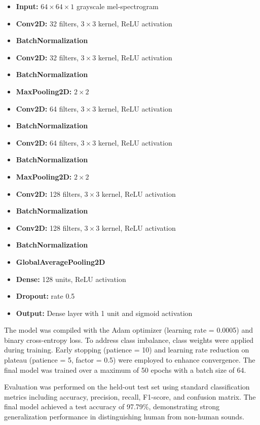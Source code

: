 \begin{itemize}
  \item \textbf{Input:} $64 \times 64 \times 1$ grayscale mel-spectrogram
  \item \textbf{Conv2D:} 32 filters, $3 \times 3$ kernel, ReLU activation
  \item \textbf{BatchNormalization}
  \item \textbf{Conv2D:} 32 filters, $3 \times 3$ kernel, ReLU activation
  \item \textbf{BatchNormalization}
  \item \textbf{MaxPooling2D:} $2 \times 2$
  \item \textbf{Conv2D:} 64 filters, $3 \times 3$ kernel, ReLU activation
  \item \textbf{BatchNormalization}
  \item \textbf{Conv2D:} 64 filters, $3 \times 3$ kernel, ReLU activation
  \item \textbf{BatchNormalization}
  \item \textbf{MaxPooling2D:} $2 \times 2$
  \item \textbf{Conv2D:} 128 filters, $3 \times 3$ kernel, ReLU activation
  \item \textbf{BatchNormalization}
  \item \textbf{Conv2D:} 128 filters, $3 \times 3$ kernel, ReLU activation
  \item \textbf{BatchNormalization}
  \item \textbf{GlobalAveragePooling2D}
  \item \textbf{Dense:} 128 units, ReLU activation
  \item \textbf{Dropout:} rate 0.5
  \item \textbf{Output:} Dense layer with 1 unit and sigmoid activation
\end{itemize}

The model was compiled with the Adam optimizer (learning rate = 0.0005) and binary cross-entropy loss. To address class imbalance, class weights were applied during training. Early stopping (patience = 10) and learning rate reduction on plateau (patience = 5, factor = 0.5) were employed to enhance convergence. The final model was trained over a maximum of 50 epochs with a batch size of 64.

Evaluation was performed on the held-out test set using standard classification metrics including accuracy, precision, recall, F1-score, and confusion matrix. The final model achieved a test accuracy of 97.79\%, demonstrating strong generalization performance in distinguishing human from non-human sounds.

